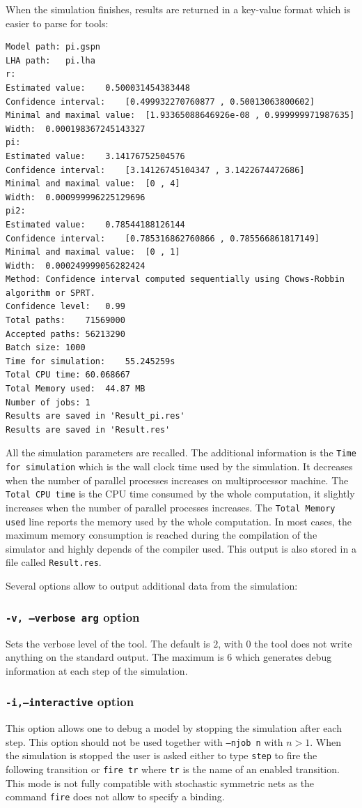 \documentclass{article}
\begin{document}
When the simulation finishes, results are returned in a key-value
format which is easier to parse for tools:
\begin{scriptsize}
\begin{verbatim}
Model path:	pi.gspn
LHA path:	pi.lha
r:
Estimated value:	0.500031454383448
Confidence interval:	[0.499932270760877 , 0.50013063800602]
Minimal and maximal value:	[1.93365088646926e-08 , 0.999999971987635]
Width:	0.000198367245143327
pi:
Estimated value:	3.14176752504576
Confidence interval:	[3.14126745104347 , 3.1422674472686]
Minimal and maximal value:	[0 , 4]
Width:	0.000999996225129696
pi2:
Estimated value:	0.78544188126144
Confidence interval:	[0.785316862760866 , 0.785566861817149]
Minimal and maximal value:	[0 , 1]
Width:	0.000249999056282424
Method:	Confidence interval computed sequentially using Chows-Robbin algorithm or SPRT.
Confidence level:	0.99
Total paths:	71569000
Accepted paths:	56213290
Batch size:	1000
Time for simulation:	55.245259s
Total CPU time:	60.068667
Total Memory used:	44.87 MB
Number of jobs:	1
Results are saved in 'Result_pi.res'
Results are saved in 'Result.res'
\end{verbatim}
\end{scriptsize}
All the simulation parameters are recalled. The additional information
is the \texttt{Time for simulation} which is the wall clock time used
by the simulation.  It decreases when the number of parallel processes
increases on multiprocessor machine.  The \texttt{Total CPU time} is
the CPU time consumed by the whole computation, it slightly increases
when the number of parallel processes increases. The \texttt{Total
  Memory used} line reports the memory used by the whole
computation. In most cases, the maximum memory consumption is reached
during the compilation of the simulator and highly depends of the
compiler used. This output is also stored in a file called
\texttt{Result.res}.

Several options allow to output additional data from the simulation:

\subsubsection{\texttt{-v, --verbose arg} option}
Sets the verbose level of the tool. The default is $2$, with $0$ the tool
does not write anything on the standard output. The maximum is $6$ which 
generates debug information at each step of the simulation.

\subsubsection{\texttt{-i,--interactive} option}
This option allows one to debug a model by stopping the simulation after
each step.  This option should not be used together with
\texttt{--njob n} with $n>1$.  When the simulation is stopped the user
is asked either to type \texttt{step} to fire the following transition
or \texttt{fire tr} where \texttt{tr} is the name of an enabled
transition. This mode is not fully compatible with stochastic
symmetric nets as the command \texttt{fire} does not allow to specify
a binding.
\end{document}
